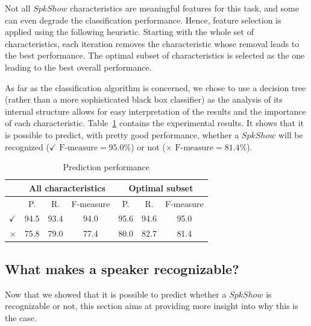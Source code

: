 Not all $SpkShow$ characteristics are meaningful features for this task, and some can even degrade the classification performance. 
Hence, feature selection is applied using the following heuristic.
Starting with the whole set of characteristics, each iteration removes the characteristic whose removal leads to the best performance.
The optimal subset of characteristics is selected as the one leading to the best overall performance.

As far as the classification algorithm is concerned, we chose to use a decision tree (rather than a more sophisticated black box classifier) as the analysis of its internal structure allows for easy interpretation of the results and the importance of each characteristic.
Table~\ref{tableresult} contains the experimental results. It shows that it is possible to predict, with pretty good performance, whether a $SpkShow$ will be recognized ($\checkmark$ $\text{F-measure} = 95.0\%$) or not ($\times$ $\text{F-measure} = 81.4\%$). 

\begin{table}[t]
\begin{center}
\begin{tabular}{|r|c|c|c|c|c|c|}
\hline
& \multicolumn{3}{c|}{All characteristics} & \multicolumn{3}{c|}{Optimal subset} \\
\hline
& P. & R. & F-measure & P. & R. & F-measure \\
\hline
$\checkmark$ & 94.5 & 93.4 & 94.0 & 95.6 & 94.6 & 95.0 \\
\hline
$\times$ & 75.8 & 79.0 & 77.4 & 80.0 & 82.7 & 81.4 \\
\hline
\end{tabular}
\caption{Prediction performance}
\label{tableresult}
\end{center}
\end{table}

\subsection{What makes a speaker recognizable?}

Now that we showed that it is possible to predict whether a $SpkShow$ is recognizable or not, this section aims at providing more insight into why this is the case.

